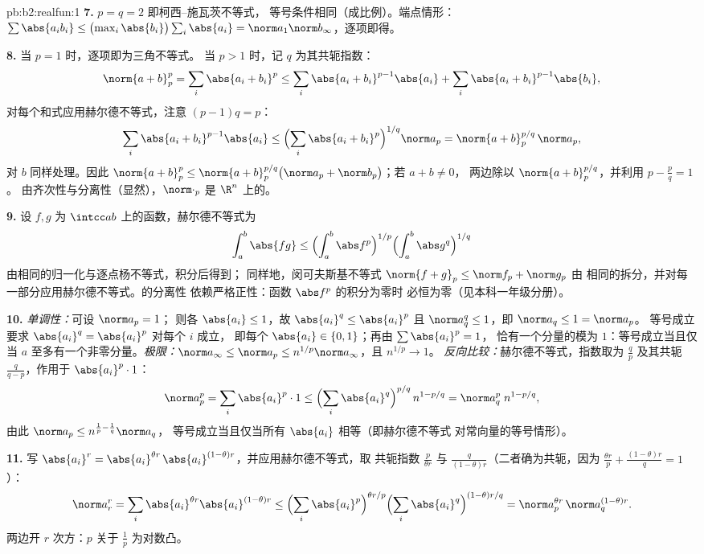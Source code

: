 \begin{solution}{pb:b2:realfun:1}
\textbf{7.} $p = q = 2$ 即柯西--施瓦茨不等式，
等号条件相同（成比例）。端点情形：$\sum\abs{a_ib_i}
\leq \bigl(\max_i\abs{b_i}\bigr)\sum_i\abs{a_i} =
\norm a_1\norm b_\infty$，逐项即得。

\textbf{8.} 当 $p = 1$ 时，逐项即为三角不等式。
当 $p > 1$ 时，记 $q$ 为其共轭指数：
\[
\norm{a+b}_p^p = \sum_i\abs{a_i + b_i}^p
\leq \sum_i\abs{a_i+b_i}^{p-1}\abs{a_i} +
\sum_i\abs{a_i+b_i}^{p-1}\abs{b_i},
\]
对每个和式应用赫尔德不等式，注意 $(p - 1)q = p$：
\[
\sum_i\abs{a_i+b_i}^{p-1}\abs{a_i} \leq
\Bigl(\sum_i\abs{a_i+b_i}^{p}\Bigr)^{1/q}\norm a_p
= \norm{a + b}_p^{p/q}\,\norm a_p ,
\]
对 $b$ 同样处理。因此 $\norm{a+b}_p^p \leq \norm{a +
b}_p^{p/q}\bigl(\norm a_p + \norm b_p\bigr)$；若 $a + b \neq 0$，
两边除以 $\norm{a+b}_p^{p/q}$，并利用 $p - \frac pq = 1$。
由齐次性与分离性（显然），$\norm\cdot_p$ 是
$\R^n$ 上的。

\textbf{9.} 设 $f, g$ 为 $\intcc ab$ 上的函数，赫尔德不等式为
\[
\int_a^b\abs{fg} \leq \Bigl(\int_a^b\abs
f^p\Bigr)^{1/p}\Bigl(\int_a^b\abs g^q\Bigr)^{1/q}
\]
由相同的归一化与逐点杨不等式，积分后得到；
同样地，闵可夫斯基不等式 $\norm{f + g}_p \leq \norm f_p + \norm g_p$ 由
相同的拆分，并对每一部分应用赫尔德不等式。的分离性
依赖严格正性：函数 $\abs f^p$ 的积分为零时
必恒为零（见本科一年级分册）。

\textbf{10.} \emph{单调性：}可设 $\norm a_p = 1$；
则各 $\abs{a_i} \leq 1$，故 $\abs{a_i}^q \leq \abs{a_i}^p$
且 $\norm a_q^q \leq 1$，即 $\norm a_q \leq 1 = \norm a_p$。
等号成立要求 $\abs{a_i}^q = \abs{a_i}^p$ 对每个 $i$ 成立，
即每个 $\abs{a_i} \in \{0, 1\}$；再由 $\sum\abs{a_i}^p = 1$，
恰有一个分量的模为 $1$：等号成立当且仅当
$a$ 至多有一个非零分量。\emph{极限：}$\norm a_\infty \leq
\norm a_p \leq n^{1/p}\norm a_\infty$，且 $n^{1/p} \to 1$。
\emph{反向比较：}赫尔德不等式，指数取为 $\frac
qp$ 及其共轭 $\frac{q}{q-p}$，作用于
$\abs{a_i}^p\cdot 1$：
\[
\norm a_p^p = \sum_i\abs{a_i}^p\cdot 1 \leq
\Bigl(\sum_i\abs{a_i}^{q}\Bigr)^{p/q}\,n^{1 - p/q}
= \norm a_q^{p}\; n^{1-p/q},
\]
由此 $\norm a_p \leq n^{\frac1p - \frac1q}\norm a_q$，
等号成立当且仅当所有 $\abs{a_i}$ 相等（即赫尔德不等式
对常向量的等号情形）。

\textbf{11.} 写 $\abs{a_i}^r = \abs{a_i}^{\theta
r}\,\abs{a_i}^{(1-\theta)r}$，并应用赫尔德不等式，取
共轭指数 $\frac{p}{\theta r}$ 与
$\frac{q}{(1-\theta)r}$（二者确为共轭，因为 $\frac{\theta
r}p + \frac{(1-\theta)r}q = 1$）：
\[
\norm a_r^r = \sum_i \abs{a_i}^{\theta r}\abs{a_i}^{(1-\theta)r}
\leq \Bigl(\sum_i\abs{a_i}^{p}\Bigr)^{\theta r/p}
\Bigl(\sum_i\abs{a_i}^{q}\Bigr)^{(1-\theta)r/q}
= \norm a_p^{\theta r}\,\norm a_q^{(1-\theta)r} .
\]
两边开 $r$ 次方：$p$ 关于 $\frac1p$ 为对数凸。


\end{solution}
